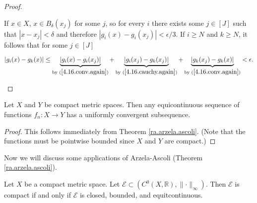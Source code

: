 \begin{proof}
\begin{enumerate}
 If \(x \in X\), \(x \in B_\delta(x_j)\) for some \(j\), so for every \(i\) there exists some \(j \in [J]\) such that \(|x - x_j| < \delta\) and therefore \(|g_i(x) - g_i(x_j)| < \epsilon/3\). If \(i \geq N\) and \(k \geq N\), it follows that for some \(j \in [J]\)

\[
|g_i(x) - g_k(x)| \leq \underbrace{| g_i(x) - g_i(x_j)|}_{\text{by } (\ref{4.16.conv.again})} + \underbrace{|g_i(x_j) - g_k(x_j)|}_{\text{by } (\ref{4.16.cauchy.again})}  + \underbrace{|g_k(x_j) - g_k(x)|}_{\text{by } (\ref{4.16.conv.again})} < \epsilon.
\]



%
%
%

\end{enumerate}

\end{proof}

\begin{theorem}\label{ra.arzela.ascolia.cmpct}

Let \(X\) and \(Y\) be compact metric spaces. Then any equicontinuous sequence of functions \(f_n: X \to Y\) has a uniformly convergent subsequence.

\end{theorem}

\begin{proof}

This follows immediately from Theorem \ref{ra.arzela.ascoli}. (Note that the functions must be pointwise bounded since \(X\) and \(Y\) are compact.)

\end{proof}

Now we will discuss some applications of Arzela-Ascoli (Theorem \ref{ra.arzela.ascoli}).

\begin{theorem}\label{ra.thm.gen.heine.borel.fnc}

Let \(X\) be a compact metric space. Let \(\mathcal{E} \subset (C^0(X, \mathbb{R}), \lVert \cdot \rVert_\infty)\). Then \(\mathcal{E}\) is compact if and only if \(\mathcal{E}\) is closed, bounded, and equitcontinuous.

\end{theorem}

